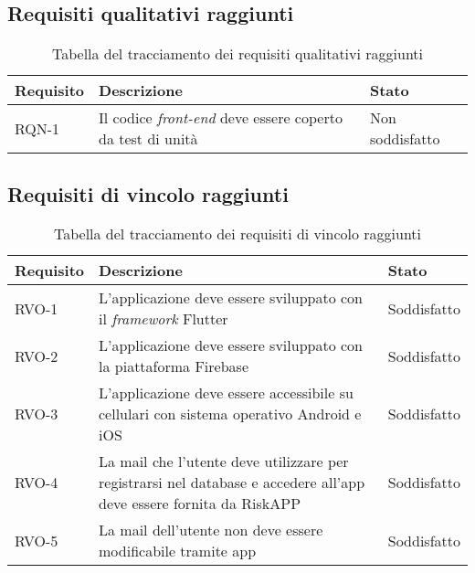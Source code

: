 \newpage

\subsection{Requisiti qualitativi raggiunti}

\begin{table}[htb]%
\caption{Tabella del tracciamento dei requisiti qualitativi raggiunti}
\label{tab:reqqualitativi-raggiunti}
\begin{tabularx}{\textwidth}{lXl}
\hline
\textbf{Requisito} & \textbf{Descrizione} & \textbf{Stato}\\
\hline\hline
RQN-1    & Il codice \emph{front-end} deve essere coperto da test di unità & Non soddisfatto \\
\hline
\end{tabularx}
\end{table}%

\subsection{Requisiti di vincolo raggiunti}

\begin{table}[htb]%
\caption{Tabella del tracciamento dei requisiti di vincolo raggiunti}
\label{tab:reqvincolo-raggiunti}
\begin{tabularx}{\textwidth}{lXl}
\hline
\textbf{Requisito} & \textbf{Descrizione} & \textbf{Stato}\\
\hline\hline
RVO-1    & L'applicazione deve essere sviluppato con il \emph{framework} Flutter & Soddisfatto \\
\hline
RVO-2    & L'applicazione deve essere sviluppato con la piattaforma Firebase & Soddisfatto \\
\hline
RVO-3    & L'applicazione deve essere accessibile su cellulari con sistema operativo Android e iOS & Soddisfatto \\
\hline
RVO-4    & La mail che l'utente deve utilizzare per registrarsi nel database e accedere all'app deve essere fornita da RiskAPP & Soddisfatto \\
\hline
RVO-5    & La mail dell'utente non deve essere modificabile tramite app & Soddisfatto \\
\hline
\end{tabularx}
\end{table}%


